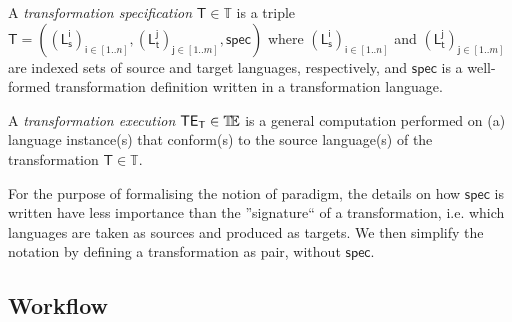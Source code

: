 \begin{Definition}
   A \emph{transformation specification} $\mathsf{T}\in\mathbb{T}$ is a triple 
$\mathsf{T} = ((\mathsf{L_s^{i}})_{\mathsf{i}\in [1..n]}, 
(\mathsf{L_t^{j}})_{\mathsf{j}\in[1..m]}, \mathsf{spec})$ where  
$(\mathsf{L_s^{i}})_{\mathsf{i}\in [1..n]}$ and
$(\mathsf{L_t^{j}})_{\mathsf{j}\in [1..m]}$ are indexed sets of source and
target languages, respectively, and $\mathsf{spec}$ is a well-formed 
transformation definition written in a transformation language.

   A \emph{transformation execution} $\mathsf{TE_{T}}\in\mathbb{T}\!\mathbb{E}$ is a general 
computation performed on (a) language instance(s) that conform(s) to the source 
language(s) of the transformation $\mathsf{T}\in\mathbb{T}$.
\end{Definition}
For the purpose of formalising the notion of paradigm, the details on how 
$\mathsf{spec}$ is written have less importance than the ''signature`` of 
a transformation, i.e. which languages are taken as sources and produced as 
targets. We then simplify the notation by defining a transformation as pair, 
without $\mathsf{spec}$.




\begin{Example}
   
\end{Example}


\subsection{Workflow}
\label{sec:Workflow}

